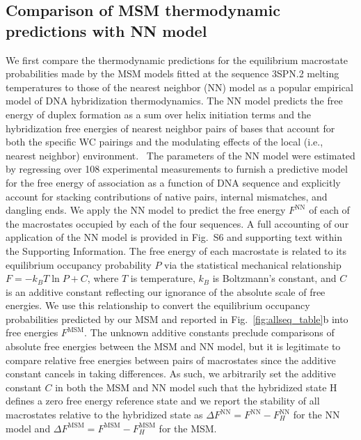 \documentclass[journal=jpcbfk,manuscript=article]{achemso}
\newcommand*{\rood}[1]{{#1}}
\newcommand*{\blauw}[1]{{#1}}
\begin{document}
\subsection{Comparison of MSM thermodynamic predictions with NN model} \label{sec:NN}

We first compare the thermodynamic predictions for the equilibrium macrostate probabilities \rood{made by the MSM models fitted at the sequence 3SPN.2 melting temperatures} to those of the nearest neighbor (NN) model as a popular empirical model of DNA hybridization thermodynamics. The NN model predicts the free energy of duplex formation as a sum over helix initiation terms and the hybridization free energies of nearest neighbor pairs of bases that account for both the specific WC pairings and the modulating effects of the local (i.e., nearest neighbor) environment.~\citep{SantaLucia1998AThermodynamics, Santalucia2004TheMotifs} The parameters of the NN model were estimated by regressing over 108 experimental measurements to furnish a predictive model for the free energy of association as a function of DNA sequence and explicitly account for stacking contributions of native pairs, internal mismatches, and dangling ends. We apply the NN model to predict the free energy $F^\mathrm{NN}$ of each of the macrostates occupied by each of the four sequences. A full accounting of our application of the NN model is provided in \blauw{Fig.~S6} \rood{and supporting text within} the \blauw{Supporting Information}. The free energy of each macrostate is related to its equilibrium occupancy probability $P$ via the statistical mechanical relationship $F = -k_B T \ln P + C$, where $T$ is temperature, $k_B$ is Boltzmann's constant, and $C$ is an additive constant reflecting our ignorance of the absolute scale of free energies. We use this relationship to convert the equilibrium occupancy probabilities predicted by our MSM and reported in Fig.~\ref{fig:allseq_table}b into free energies $F^\mathrm{MSM}$. The unknown additive constants preclude comparisons of absolute free energies between the MSM and NN model, but it is legitimate to compare relative free energies between pairs of macrostates since the additive constant cancels in taking differences. As such, we arbitrarily set the additive constant $C$ in both the MSM and NN model such that the hybridized state H defines a zero free energy reference state and we report the stability of all macrostates relative to the hybridized state as $\Delta F^\mathrm{NN} = F^\mathrm{NN} - F_H^\mathrm{NN}$ for the NN model and $\Delta F^\mathrm{MSM} = F^\mathrm{MSM} - F_H^\mathrm{MSM}$ for the MSM. 
\end{document}
